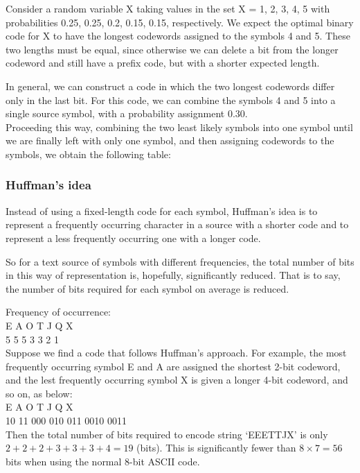 
\begin{frame}
Consider a random variable X taking values in the set
X = {1, 2, 3, 4, 5} with probabilities 0.25, 0.25, 0.2, 0.15, 0.15, respectively.
We expect the optimal binary code for X to have the longest
codewords assigned to the symbols 4 and 5. These two lengths must be
equal, since otherwise we can delete a bit from the longer codeword and
still have a prefix code, but with a shorter expected length.


\end{frame}



\begin{frame} In general,
we can construct a code in which the two longest codewords differ only
in the last bit. For this code, we can combine the symbols 4 and 5 into
a single source symbol, with a probability assignment 0.30. \\ Proceeding
this way, combining the two least likely symbols into one symbol until
we are finally left with only one symbol, and then assigning codewords
to the symbols, we obtain the following table:


\end{frame}

\begin{frame}
\frametitle{Huffman’s idea}
Instead of using a fixed-length code for each symbol, Huffman’s idea is to
represent a frequently occurring character in a source with a shorter code and
to represent a less frequently occurring one with a longer code. 

So for a text
source of symbols with different frequencies, the total number of bits in this
way of representation is, hopefully, significantly reduced. That is to say, the
number of bits required for each symbol on average is reduced.
\end{frame}
\begin{frame}
Frequency of occurrence:\\
E A O T J Q X\\
5 5 5 3 3 2 1\\
Suppose we find a code that follows Huffman’s approach. For example, the
most frequently occurring symbol E and A are assigned the shortest 2-bit
codeword, and the lest frequently occurring symbol X is given a longer 4-bit
codeword, and so on, as below:\\
E A O T J Q X\\
10 11 000 010 011 0010 0011\\
Then the total number of bits required to encode string `EEETTJX’ is only
$2 + 2 + 2 + 3 + 3 + 3 + 4 = 19$ (bits). This is significantly fewer than
$8 \times 7 = 56$ bits when using the normal 8-bit ASCII code.
\end{frame}

